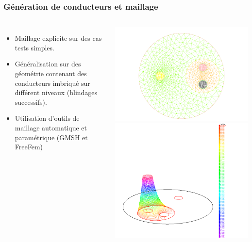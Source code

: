 \begin{frame}
  \frametitle{G\'en\'eration de conducteurs et maillage}
  \begin{columns}[T]
    \begin{itemize}
      \item Maillage explicite sur des cas tests simples.
      \item G\'en\'eralisation sur des g\'eom\'etrie contenant des conducteurs
        imbriqu\'e sur diff\'erent niveaux (blindages successifs).
      \item Utilisation d'outils de maillage automatique et param\'etrique (GMSH et FreeFem)
    \end{itemize}
    \centering
    \includegraphics[width=.7\linewidth]{figures/gui/mesh-1.pdf}\\
    \includegraphics[width=.7\linewidth]{figures/gui/sol3D-1.pdf}
  \end{columns}
\end{frame}

